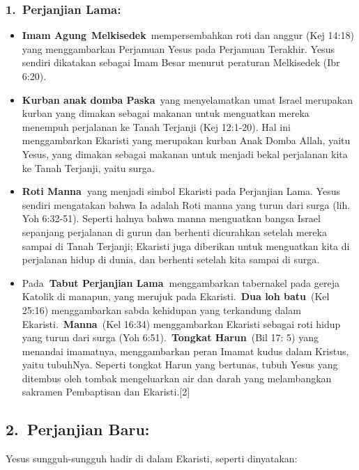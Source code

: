 \subsubsection[1.~Perjanjian Lama:]{1.~\textbf{Perjanjian Lama}:}
\begin{itemize}
\item \textbf{Imam Agung}~\textbf{Melkisedek}~mempersembahkan roti dan
anggur (Kej 14:18) yang menggambarkan Perjamuan Yesus pada Perjamuan
Terakhir. Yesus sendiri dikatakan sebagai Imam Besar menurut peraturan
Melkisedek (Ibr 6:20).
\item \textbf{Kurban anak domba Paska}~yang menyelamatkan umat Israel
merupakan kurban yang dimakan sebagai makanan untuk menguatkan mereka
menempuh perjalanan ke Tanah Terjanji (Kej 12:1-20). Hal ini
menggambarkan Ekaristi yang merupakan kurban Anak Domba Allah, yaitu
Yesus, yang dimakan sebagai makanan untuk menjadi bekal perjalanan kita
ke Tanah Terjanji, yaitu surga.
\item \textbf{Roti Manna~}yang menjadi simbol Ekaristi pada Perjanjian
Lama. Yesus sendiri mengatakan bahwa Ia adalah Roti manna yang turun
dari surga (lih. Yoh 6:32-51). Seperti halnya bahwa manna menguatkan
bangsa Israel sepanjang perjalanan di gurun dan berhenti dicurahkan
setelah mereka sampai di Tanah Terjanji; Ekaristi juga diberikan untuk
menguatkan kita di perjalanan hidup di dunia, dan berhenti setelah kita
sampai di surga.
\item Pada\textbf{~}\textbf{Tabut Perjanjian Lama~}menggambarkan
tabernakel pada gereja Katolik di manapun, yang merujuk pada
Ekaristi.~\textbf{Dua loh batu}~(Kel 25:16) menggambarkan sabda
kehidupan yang terkandung dalam Ekaristi.~\textbf{Manna}~(Kel 16:34)
menggambarkan Ekaristi sebagai roti hidup yang turun dari surga (Yoh
6:51).~\textbf{Tongkat Harun}~(Bil 17: 5) yang menandai imamatnya,
menggambarkan peran Imamat kudus dalam Kristus, yaitu tubuhNya. Seperti
tongkat Harun yang bertunas, tubuh Yesus yang ditembus oleh tombak
mengeluarkan air dan darah yang melambangkan sakramen Pembaptisan dan
Ekaristi.[2]
\end{itemize}
\subsection[2.~Perjanjian Baru:]{2.~\textbf{Perjanjian Baru}:}
Yesus sungguh-sungguh hadir di dalam Ekaristi, seperti dinyatakan:

